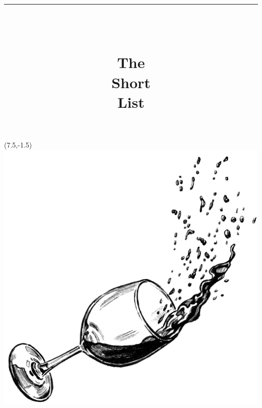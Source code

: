 \documentclass{article}
\title{\vspace{-1in}\rule{\textwidth}{1.5pt}\\\begin{spacing}{.4}\textbf{\Huge\color{BrickRed} The\\Short\\List}\end{spacing}\vspace{-.5in}}
\date{}
\begin{document}
\maketitle
\begin{textblock}{1}(7.5,-1.5)\includegraphics{wine.png}\end{textblock}
\end{document}
